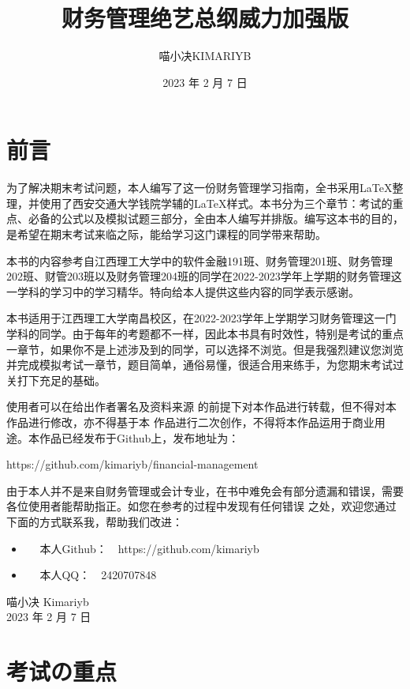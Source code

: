 \documentclass[
  10pt,
  twoside,
  openany,
  b5paper, %
  colorscheme = black, %
  xits = false,
]{qyxf-book}
\title{财务管理绝艺总纲威力加强版}
\subtitle{}  %
\author{喵小决KIMARIYB}
\date{2023 年 2 月 7 日}
\begin{document}
\maketitle
\tableofcontents

\chapter*{前言}

为了解决期末考试问题，本人编写了这一份财务管理学习指南，全书采用\LaTeX 整理，并使用了西安交通大学钱院学辅的\LaTeX 样式。本书分为三个章节：考试的重点、必备的公式以及模拟试题三部分，全由本人编写并排版。编写这本书的目的，是希望在期末考试来临之际，能给学习这门课程的同学带来帮助。

本书的内容参考自江西理工大学中的软件金融191班、财务管理201班、财务管理202班、财管203班以及财务管理204班的同学在2022-2023学年上学期的财务管理这一学科的学习中的学习精华。特向给本人提供这些内容的同学表示感谢。

本书适用于江西理工大学南昌校区，在2022-2023学年上学期学习财务管理这一门学科的同学。由于每年的考题都不一样，因此本书具有时效性，特别是考试的重点一章节，如果你不是上述涉及到的同学，可以选择不浏览。但是我强烈建议您浏览并完成模拟考试一章节，题目简单，通俗易懂，很适合用来练手，为您期末考试过关打下充足的基础。

使用者可以在给出作者署名及资料来源
的前提下对本作品进行转载，但不得对本作品进行修改，亦不得基于本
作品进行二次创作，不得将本作品运用于商业用途。本作品已经发布于Github上，发布地址为：

https://github.com/kimariyb/financial-management

由于本人并不是来自财务管理或会计专业，在书中难免会有部分遗漏和错误，需要各位使用者能帮助指正。如您在参考的过程中发现有任何错误
之处，欢迎您通过下面的方式联系我，帮助我们改进：
\begin{itemize}
	\item \faGithub ~~ 本人Github：~~https://github.com/kimariyb
	\item \faQq ~~ 本人QQ：~~2420707848
\end{itemize}



\begin{flushright}
	喵小决 Kimariyb \\
	2023 年 2 月 7 日
\end{flushright}

\chapter{考试の重点}
\end{document}
